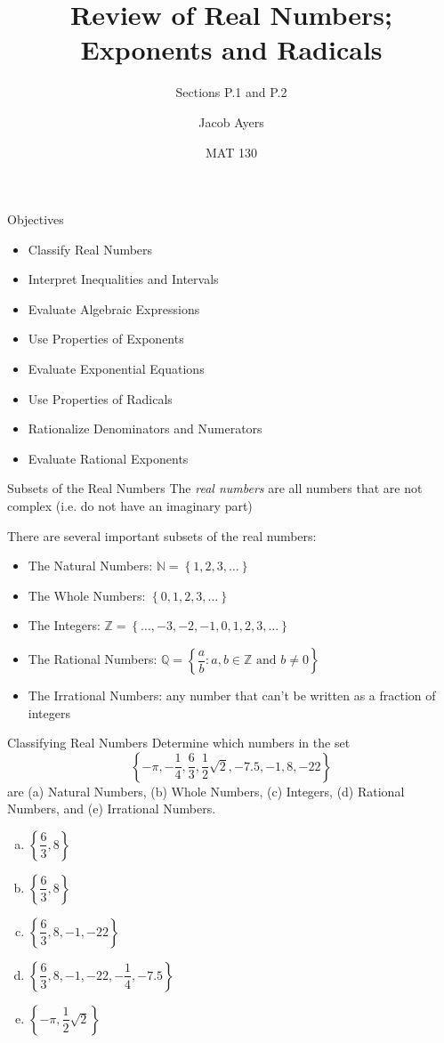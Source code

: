 \documentclass{beamer}
\title[P.1 and P.2]{Review of Real Numbers; Exponents and Radicals}
\subtitle{Sections P.1 and P.2}
\author{Jacob Ayers}
\institute{Lesson \#1}
\date{MAT 130}
\def\N{\mathbb{N}} %
\def\Z{\mathbb{Z}} %
\def\Q{\mathbb{Q}} %
\newcommand{\set}[1]{\left\{{#1}\right\}} %
\begin{document}
\begin{frame}
\titlepage
\end{frame}

\begin{frame}[t]{Objectives}
\begin{itemize}
	\item Classify Real Numbers
	\item Interpret Inequalities and Intervals
	\item Evaluate Algebraic Expressions
	\item Use Properties of Exponents
	\item Evaluate Exponential Equations
	\item Use Properties of Radicals
	\item Rationalize Denominators and Numerators
	\item Evaluate Rational Exponents
\end{itemize}
\end{frame}

\begin{frame}[t]{Subsets of the Real Numbers}
The \textit{real numbers} are all numbers that are not complex (i.e. do not have an imaginary part)

There are several important subsets of the real numbers: \vspace{-6pt} \begin{itemize}
\item<2-> The Natural Numbers: $\N = \set{1,2,3,\dots}$
\item<3-> The Whole Numbers: $\set{0,1,2,3,\dots}$
\item<4-> The Integers: $\Z = \set{\dots, -3, -2, -1, 0, 1, 2, 3, \dots}$
\item<5-> The Rational Numbers: $\Q = \set{\dfrac{a}{b} : a,b\in\Z \text{ and } b\neq 0}$
\item<6> The Irrational Numbers: any number that can't be written as a fraction of integers
\end{itemize}
\end{frame}

\begin{frame}[t]{Classifying Real Numbers}
Determine which numbers in the set $$\set{-\pi, -\dfrac14, \dfrac63, \dfrac12\sqrt{2}, -7.5, -1, 8, -22}$$ are (a) Natural Numbers, (b) Whole Numbers, (c) Integers, (d) Rational Numbers, and (e) Irrational Numbers.
\begin{enumerate}[(a)]
\item<2-> $\set{\dfrac63,8}$
\item<3-> $\set{\dfrac63,8}$
\item<4-> $\set{\dfrac63,8,-1,-22}$
\item<5-> $\set{\dfrac63,8,-1,-22,-\dfrac14,-7.5}$
\item<6> $\set{-\pi,\dfrac12\sqrt{2}}$
\end{enumerate}
\end{frame}
\end{document}
